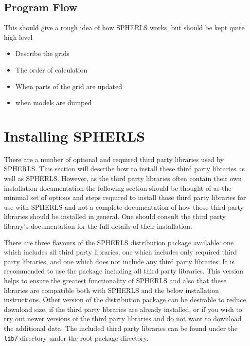 \documentclass[12pt,a4paper]{book}
\begin{document}
\section{Program Flow}
This should give a rough idea of how SPHERLS works, but should be kept quite high level
\begin{itemize}
\item Describe the grids
\item The order of calculation
\item When parts of the grid are updated
\item when models are dumped
\end{itemize}

\chapter{Installing SPHERLS}

There are a number of optional and required third party libraries used by SPHERLS. This section will describe how to install these third party libraries as well as SPHERLS. However, as the third party libraries often contain their own installation documentation the following section should be thought of as the minimal set of options and steps required to install those third party libraries for use with SPHERLS and not a complete documentation of how those third party libraries should be installed in general. One should consult the third party library's documentation for the full details of their installation.

There are three flavours of the SPHERLS distribution package available: one which includes all third party libraries, one which includes only required third party libraries, and one which does not include any third party libraries. It is recommended to use the package including all third party libraries. This version helps to ensure the greatest functionality of SPHERLS and also that these libraries are compatible both with SPHERLS and the below installation instructions. Other version of the distribution package can be desirable to reduce download size, if the third party libraries are already installed, or if you wish to try out newer versions of the third party libraries and do not want to download the additional data. The included third party libraries can be found under the {\tt lib/} directory under the root package directory.
\end{document}
